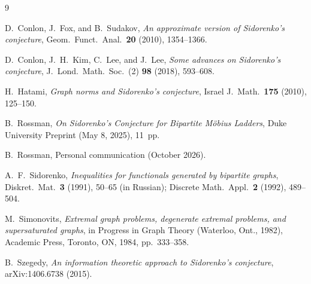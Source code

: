 \documentclass[11pt,a4paper]{article}
\theoremstyle{plain}
\theoremstyle{definition}
\theoremstyle{remark}
\begin{document}
\begin{thebibliography}{9}

D.~Conlon, J.~Fox, and B.~Sudakov,
\emph{An approximate version of Sidorenko's conjecture},
Geom.\ Funct.\ Anal.\ \textbf{20} (2010), 1354--1366.

D.~Conlon, J.~H.~Kim, C.~Lee, and J.~Lee,
\emph{Some advances on Sidorenko's conjecture},
J.\ Lond.\ Math.\ Soc.\ (2) \textbf{98} (2018), 593--608.

H.~Hatami,
\emph{Graph norms and Sidorenko's conjecture},
Israel J.\ Math.\ \textbf{175} (2010), 125--150.

B.~Rossman,
\emph{On Sidorenko's Conjecture for Bipartite M\"obius Ladders},
Duke University Preprint (May 8, 2025), 11~pp.

B.~Rossman,
Personal communication (October 2026).

A.~F.~Sidorenko,
\emph{Inequalities for functionals generated by bipartite graphs},
Diskret.\ Mat.\ \textbf{3} (1991), 50--65 (in Russian); Discrete Math.\ Appl.\ \textbf{2} (1992), 489--504.

M.~Simonovits,
\emph{Extremal graph problems, degenerate extremal problems, and supersaturated graphs},
in Progress in Graph Theory (Waterloo, Ont., 1982), Academic Press, Toronto, ON, 1984, pp.~333--358.

B.~Szegedy,
\emph{An information theoretic approach to Sidorenko's conjecture},
arXiv:1406.6738 (2015).

\end{thebibliography}
\end{document}
